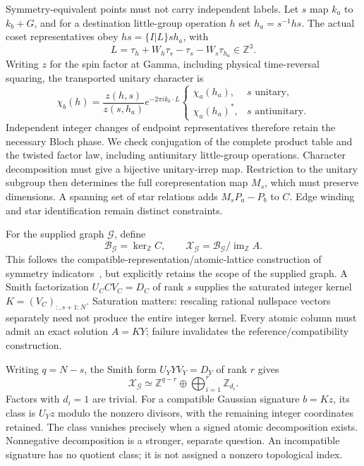Symmetry-equivalent points must not carry independent labels. Let
$s$ map $k_a$ to $k_b+G$, and for a destination little-group operation
$h$ set $h_a=s^{-1}hs$. The actual coset representatives obey
$hs=\{I|L\}sh_a$, with
\begin{equation}
 L=\tau_h+W_h\tau_s-\tau_s-W_s\tau_{h_a}\in\mathbb Z^3.
\end{equation}
Writing $z$ for the spin factor at Gamma, including physical
time-reversal squaring, the transported unitary character is
\begin{equation}
 \chi_b(h)=\frac{z(h,s)}{z(s,h_a)}e^{-2\pi i k_b\cdot L}
 \begin{cases}
 \chi_a(h_a),&s\text{ unitary},\\
 \chi_a(h_a)^*,&s\text{ antiunitary}.
 \end{cases}
 \label{eq:star-character-transport}
\end{equation}
Independent integer changes of endpoint representatives therefore
retain the necessary Bloch phase. We check conjugation of the
complete product table and the twisted factor law, including
antiunitary little-group operations. Character decomposition must
give a bijective unitary-irrep map. Restriction to the unitary
subgroup then determines the full corepresentation map $M_s$,
which must preserve dimensions. A spanning set of star relations
adds $M_sP_a-P_b$ to $C$. Edge winding and star identification
remain distinct constraints.

For the supplied graph $\mathcal G$, define
\begin{equation}
 \mathcal B_{\mathcal G}=\ker_{\mathbb Z} C,\qquad
 \mathcal X_{\mathcal G}
 =\mathcal B_{\mathcal G}/\operatorname{im}_{\mathbb Z}A.
 \label{eq:graph-quotient}
\end{equation}
This follows the compatible-representation/atomic-lattice construction
of symmetry indicators~\cite{Po2017}, but explicitly retains the scope
of the supplied graph. A Smith factorization $U_CCV_C=D_C$ of rank
$s$ supplies the saturated integer kernel
$K=(V_C)_{:,s+1:N}$. Saturation matters: rescaling rational nullspace
vectors separately need not produce the entire integer kernel.
Every atomic column must admit an exact solution $A=KY$; failure
invalidates the reference/compatibility construction.

Writing $q=N-s$, the Smith form $U_YYV_Y=D_Y$ of rank $r$ gives
\begin{equation}
 \mathcal X_{\mathcal G}\simeq
 \mathbb Z^{q-r}\oplus\bigoplus_{i=1}^{r}\mathbb Z_{d_i}.
 \label{eq:graph-quotient-factors}
\end{equation}
Factors with $d_i=1$ are trivial. For a compatible Gaussian signature
$b=Kz$, its class is $U_Yz$ modulo the nonzero divisors, with the
remaining integer coordinates retained. The class vanishes precisely
when a signed atomic decomposition exists. Nonnegative decomposition
is a stronger, separate question. An incompatible signature has no
quotient class; it is not assigned a nonzero topological index.

